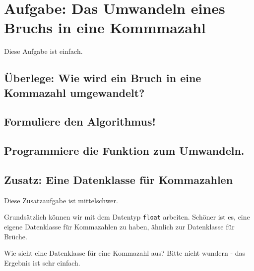 \section{Aufgabe: Das Umwandeln eines Bruchs in eine Kommmazahl}

Diese Aufgabe ist einfach.

\subsection*{Überlege: Wie wird ein Bruch in eine Kommazahl umgewandelt?}

\subsection*{Formuliere den Algorithmus!}

\subsection*{Programmiere die Funktion zum Umwandeln.}

\subsection*{Zusatz: Eine Datenklasse für Kommazahlen}

Diese Zusatzaufgabe ist mittelschwer.

Grundsätzlich können wir mit dem Datentyp \texttt{float} arbeiten. Schöner ist es, eine eigene Datenklasse für Kommazahlen zu haben, ähnlich zur Datenklasse für Brüche.

Wie sieht eine Datenklasse für eine Kommazahl aus? Bitte nicht wundern - das Ergebnis ist sehr einfach.
